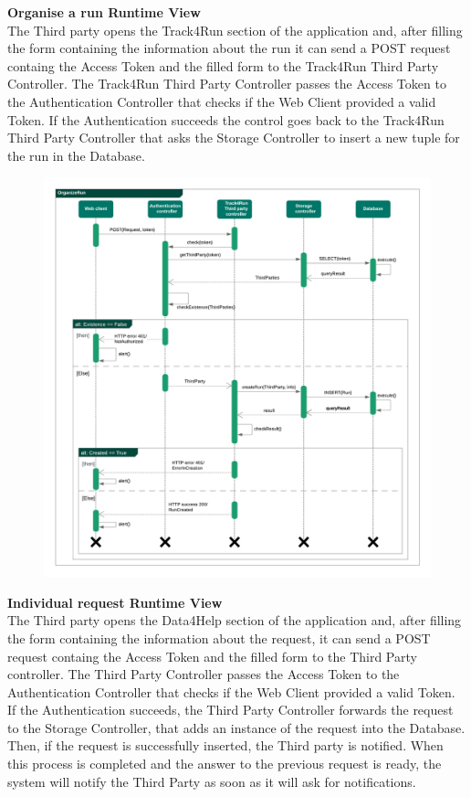 \begin{legal}
\begin{legal}
				\newpage
				\item \textbf{Organise a run Runtime View}\\
The Third party opens the Track4Run section of the application and, after filling the form containing the information about the run it can send a POST request containg the Access Token and the filled form to the Track4Run Third Party Controller.
The Track4Run Third Party Controller passes the Access Token to the Authentication Controller that checks if the Web Client provided a valid Token.
If the Authentication succeeds the control goes back to the Track4Run Third Party Controller that asks the Storage Controller to insert a new tuple for the run in the Database.
				\begin{figure}[H]
				\includegraphics[width=\linewidth]{images/seq_diagrams/organizeRunSeq.png}\\
				\end{figure}
				
				\newpage
				\item \textbf{Individual request Runtime View}\\
				The Third party opens the Data4Help section of the application and, after filling the form containing the information about the request, it can send a POST request containg the Access Token and the filled form to the Third Party controller.
The Third Party Controller passes the Access Token to the Authentication Controller that checks if the Web Client provided a valid Token.
If the Authentication succeeds, the Third Party Controller forwards the request to the Storage Controller, that adds an instance of the request into the Database. Then, if the request is successfully inserted, the Third party is notified.
When this process is completed and the answer to the previous request is ready, the system will notify the Third Party as soon as it will ask for notifications.


\end{legal}
\end{legal}
